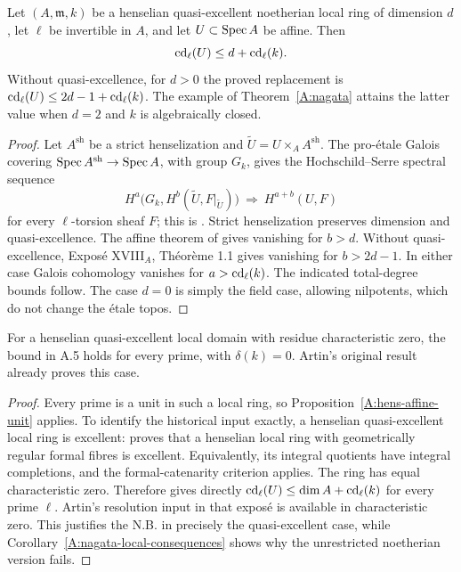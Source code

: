 \begin{proposition}
\label{A:hens-affine-unit}
Let $(A,\mathfrak m,k)$ be a henselian quasi-excellent noetherian local ring of dimension $d$, let $\ell$ be invertible in $A$, and let $U\subset\operatorname{Spec} A$ be affine. Then
\[
\operatorname{cd}_\ell(U)\leq d+\operatorname{cd}_\ell(k).
\]
Without quasi-excellence, for $d>0$ the proved replacement is
$\operatorname{cd}_\ell(U)\leq2d-1+\operatorname{cd}_\ell(k)$. The example of Theorem~\ref{A:nagata} attains the latter value when $d=2$ and $k$ is algebraically closed.
\end{proposition}
\begin{proof}
Let $A^{\mathrm{sh}}$ be a strict henselization and $\widetilde U=U\times_A A^{\mathrm{sh}}$. The pro-étale Galois covering $\operatorname{Spec} A^{\mathrm{sh}}\to\operatorname{Spec} A$, with group $G_k$, gives the Hochschild--Serre spectral sequence
\[
H^a\bigl(G_k,H^b(\widetilde U,F|_{\widetilde U})\bigr)
\ \Longrightarrow\ H^{a+b}(U,F)
\]
for every $\ell$-torsion sheaf $F$; this is \citet[Exposé VIII, \S8]{A_SGA4}. Strict henselization preserves dimension and quasi-excellence. The affine theorem of \citet[Exposé XV, Corollaire 1.2.2]{A_ILO2014} gives vanishing for $b>d$. Without quasi-excellence, Exposé XVIII$_A$, Théorème 1.1 gives vanishing for $b>2d-1$. In either case Galois cohomology vanishes for $a>\operatorname{cd}_\ell(k)$. The indicated total-degree bounds follow. The case $d=0$ is simply the field case, allowing nilpotents, which do not change the étale topos.
\end{proof}

\begin{corollary}[Known; A.5.N.B. on 31/087]
\label{A:artin-NB}
For a henselian quasi-excellent local domain with residue characteristic zero, the bound in A.5 holds for every prime, with $\delta(k)=0$. Artin's original result already proves this case.
\end{corollary}
\begin{proof}
Every prime is a unit in such a local ring, so Proposition~\ref{A:hens-affine-unit} applies. To identify the historical input exactly, a henselian quasi-excellent local ring is excellent: \citet[Exposé I, Corollaire 6.3(ii)]{A_ILO2014} proves that a henselian local ring with geometrically regular formal fibres is excellent. Equivalently, its integral quotients have integral completions, and the formal-catenarity criterion applies. The ring has equal characteristic zero. Therefore \citet[Exposé XIX, Corollaire 6.2, deduced from Théorème 6.1 bis]{A_SGA4} gives directly
$\operatorname{cd}_\ell(U)\leq\dim A+\operatorname{cd}_\ell(k)$ for every prime $\ell$. Artin's resolution input in that exposé is available in characteristic zero. This justifies the N.B. in precisely the quasi-excellent case, while Corollary~\ref{A:nagata-local-consequences} shows why the unrestricted noetherian version fails.
\end{proof}

